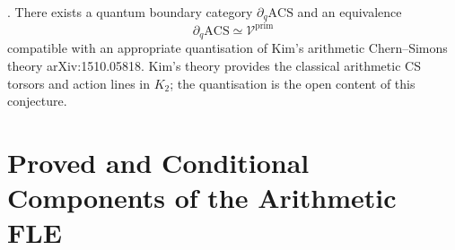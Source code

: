 \begin{conjecture}
\label{v4-arith:fle-ledger:conj:acs-boundary}
\ClaimStatusConjectured. There exists a quantum boundary category
\(\partial_{q}\mathrm{ACS}\) and an equivalence
\[
\partial_{q}\mathrm{ACS} \simeq \mathcal{V}^{\mathrm{prim}}
\]
compatible with an appropriate quantisation of Kim's arithmetic
Chern--Simons theory arXiv:1510.05818. Kim's theory provides the
classical arithmetic CS torsors and action lines in \(K_{2}\); the
quantisation is the open content of this conjecture.
\end{conjecture}

\section{Proved and Conditional Components of the Arithmetic FLE}
\label{v4-arith:fle-ledger:summary}

